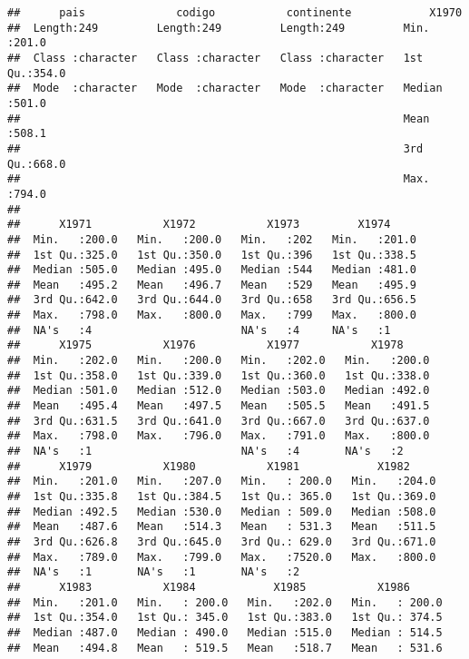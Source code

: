 \documentclass[]{book}
\theoremstyle{definition}
\theoremstyle{definition}
\theoremstyle{definition}
\theoremstyle{remark}
\begin{document}
\begin{verbatim}
##      pais              codigo           continente            X1970      
##  Length:249         Length:249         Length:249         Min.   :201.0  
##  Class :character   Class :character   Class :character   1st Qu.:354.0  
##  Mode  :character   Mode  :character   Mode  :character   Median :501.0  
##                                                           Mean   :508.1  
##                                                           3rd Qu.:668.0  
##                                                           Max.   :794.0  
##                                                                          
##      X1971           X1972           X1973         X1974      
##  Min.   :200.0   Min.   :200.0   Min.   :202   Min.   :201.0  
##  1st Qu.:325.0   1st Qu.:350.0   1st Qu.:396   1st Qu.:338.5  
##  Median :505.0   Median :495.0   Median :544   Median :481.0  
##  Mean   :495.2   Mean   :496.7   Mean   :529   Mean   :495.9  
##  3rd Qu.:642.0   3rd Qu.:644.0   3rd Qu.:658   3rd Qu.:656.5  
##  Max.   :798.0   Max.   :800.0   Max.   :799   Max.   :800.0  
##  NA's   :4                       NA's   :4     NA's   :1      
##      X1975           X1976           X1977           X1978      
##  Min.   :202.0   Min.   :200.0   Min.   :202.0   Min.   :200.0  
##  1st Qu.:358.0   1st Qu.:339.0   1st Qu.:360.0   1st Qu.:338.0  
##  Median :501.0   Median :512.0   Median :503.0   Median :492.0  
##  Mean   :495.4   Mean   :497.5   Mean   :505.5   Mean   :491.5  
##  3rd Qu.:631.5   3rd Qu.:641.0   3rd Qu.:667.0   3rd Qu.:637.0  
##  Max.   :798.0   Max.   :796.0   Max.   :791.0   Max.   :800.0  
##  NA's   :1                       NA's   :4       NA's   :2      
##      X1979           X1980           X1981            X1982      
##  Min.   :201.0   Min.   :207.0   Min.   : 200.0   Min.   :204.0  
##  1st Qu.:335.8   1st Qu.:384.5   1st Qu.: 365.0   1st Qu.:369.0  
##  Median :492.5   Median :530.0   Median : 509.0   Median :508.0  
##  Mean   :487.6   Mean   :514.3   Mean   : 531.3   Mean   :511.5  
##  3rd Qu.:626.8   3rd Qu.:645.0   3rd Qu.: 629.0   3rd Qu.:671.0  
##  Max.   :789.0   Max.   :799.0   Max.   :7520.0   Max.   :800.0  
##  NA's   :1       NA's   :1       NA's   :2                       
##      X1983           X1984            X1985           X1986       
##  Min.   :201.0   Min.   : 200.0   Min.   :202.0   Min.   : 200.0  
##  1st Qu.:354.0   1st Qu.: 345.0   1st Qu.:383.0   1st Qu.: 374.5  
##  Median :487.0   Median : 490.0   Median :515.0   Median : 514.5  
##  Mean   :494.8   Mean   : 519.5   Mean   :518.7   Mean   : 531.6  

\end{verbatim}
\end{document}
